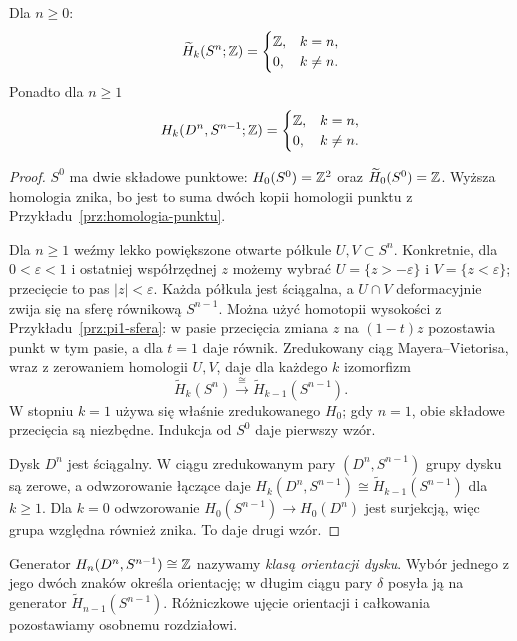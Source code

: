 \begin{twierdzenie}
\label{thm:homologia-sfer}
Dla $n\geq0$:
\[
 \widetilde H_k(S^n;\mathbb{Z})=
 \begin{cases}\mathbb{Z},&k=n,\\0,&k\ne n.\end{cases}
\]
Ponadto dla $n\geq1$
\[
 H_k(D^n,S^{n-1};\mathbb{Z})=
 \begin{cases}\mathbb{Z},&k=n,\\0,&k\ne n.\end{cases}
\]
\end{twierdzenie}
\begin{proof}
$S^0$ ma dwie składowe punktowe:
$H_0(S^0)=\mathbb{Z}^2$ oraz
$\widetilde H_0(S^0)=\mathbb{Z}$.
Wyższa homologia znika, bo jest
to suma dwóch kopii homologii
punktu z Przykładu~\ref{prz:homologia-punktu}.

Dla $n\geq1$ weźmy lekko
powiększone otwarte półkule
$U,V\subset S^n$. Konkretnie, dla $0<\varepsilon<1$ i ostatniej
współrzędnej $z$ możemy wybrać $U=\{z>-\varepsilon\}$
i $V=\{z<\varepsilon\}$; przecięcie to pas $|z|<\varepsilon$.
Każda półkula jest
ściągalna, a $U\cap V$
deformacyjnie zwija się na
sferę równikową $S^{n-1}$.
Można użyć homotopii wysokości z
Przykładu~\ref{prz:pi1-sfera}: w pasie przecięcia
zmiana $z$ na $(1-t)z$ pozostawia punkt w tym pasie,
a dla $t=1$ daje równik.
Zredukowany ciąg
Mayera--Vietorisa, wraz z
zerowaniem homologii $U,V$,
daje dla każdego $k$ izomorfizm
\[
 \widetilde H_k(S^n)
 \xrightarrow{\ \cong\ }
 \widetilde H_{k-1}(S^{n-1}).
\]
W stopniu $k=1$ używa się
właśnie zredukowanego $H_0$;
gdy $n=1$, obie składowe
przecięcia są niezbędne.
Indukcja od $S^0$ daje pierwszy wzór.

Dysk $D^n$ jest ściągalny. W ciągu
zredukowanym pary $(D^n,S^{n-1})$
grupy dysku są zerowe, a odwzorowanie
łączące daje
$H_k(D^n,S^{n-1})\cong
\widetilde H_{k-1}(S^{n-1})$
dla $k\geq1$. Dla $k=0$
odwzorowanie $H_0(S^{n-1})\to H_0(D^n)$
jest surjekcją, więc grupa
względna również znika.
To daje drugi wzór.
\end{proof}

\begin{uwaga}
Generator $H_n(D^n,S^{n-1})\cong\mathbb{Z}$
nazywamy \emph{klasą orientacji dysku}.
Wybór jednego z jego dwóch znaków
określa orientację; w długim ciągu
pary $\delta$ posyła ją na
generator $\widetilde H_{n-1}(S^{n-1})$.
Różniczkowe ujęcie orientacji
i całkowania pozostawiamy
osobnemu rozdziałowi.
\end{uwaga}

